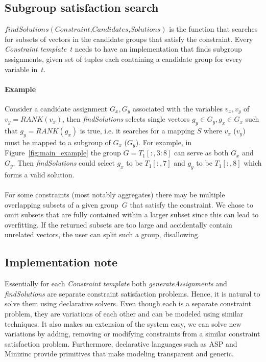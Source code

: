 \documentclass{ecai}
\newcommand{\format}[1]{\textit{#1}\xspace}
\newcommand{\generategroups}{\format{generateAssignments}}
\newcommand{\findassignment}{\format{findSolutions}}
\newcommand{\template}{\format{Constraint template}}
\newcommand{\range}[3]{\ensuremath{#1[#2,#3]}}
\newcommand{\rangeto}[2]{#1{:}#2}
\newcommand{\rangeall}{:}
\newcommand{\eccalc}[2]{\ensuremath{#1 = #2}}
\newcommand{\ecrank}[2]{\eccalc{#1}{\mathit{RANK}(#2)}}
\begin{document}
\subsection{Subgroup satisfaction search}
$\findassignment(\textit{Constraint,Candidates,Solutions})$ is the function that searches for subsets of vectors in the candidate groups that satisfy the constraint.
Every \template~$t$ needs to have an implementation that finds subgroup assignments, given set of tuples each containing a candidate group for every variable in~$t$.

\paragraph{Example}
Consider a candidate assignment $G_x, G_y$ associated with the variables $v_x,v_y$ of \ecrank{v_y}{v_x}, then \findassignment selects single vectors $g_y \in G_y, g_x \in G_x$ such that \ecrank{g_y}{g_x} is true, i.e. it searches for a mapping $S$ where $v_x$ ($v_y$) must be mapped to a subgroup of $G_x$ ($G_y$).
For example, in Figure~\ref{fig:main_example} the group $G = \range{T_1}{\rangeall}{\rangeto{3}{8}}$ can serve as both $G_x$ and $G_y$.
Then \findassignment could select $g_x$ to be $\range{T_1}{\rangeall}{7}$ and $g_y$ to be $\range{T_1}{\rangeall}{8}$ which forms a valid solution.
\\\\
For some constraints (most notably aggregates) there may be multiple overlapping subsets of a given group~$G$ that satisfy the constraint.
We chose to omit subsets that are fully contained within a larger subset since this can lead to overfitting.
If the returned subsets are too large and accidentally contain unrelated vectors, the user can split such a group, disallowing.

\subsection{Implementation note} Essentially for each \template both \generategroups and \findassignment are separate constraint satisfaction problems. Hence, it is natural to solve them using declarative solvers. Even though each is a separate constraint problem, they are variations of each other and can be modeled using similar techniques. It also makes an extension of the system easy, we can solve new variations by adding, removing or modifying constraints from a similar constraint satisfaction problem. Furthermore, declarative languages such as ASP \cite{whaisasp} and Minizinc \cite{minizinc} provide primitives that make modeling transparent and generic.
\end{document}

